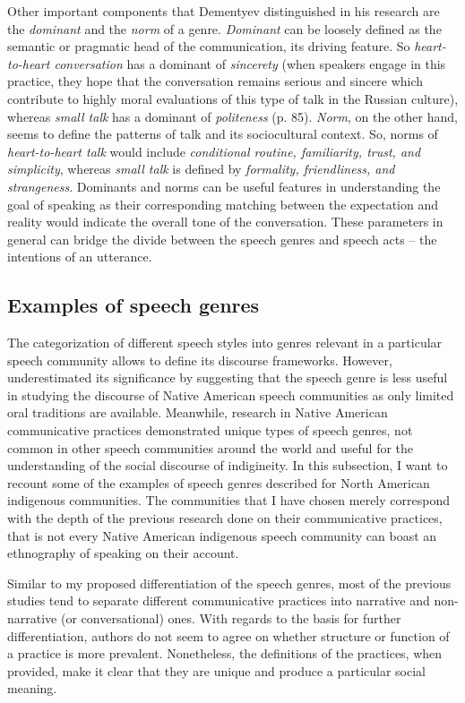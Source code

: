 \documentclass[12pt, draft]{article}
\begin{document}
Other important components that Dementyev distinguished in his research are the \textit{dominant} and the \textit{norm} of a genre. \textit{Dominant} can be loosely defined as the semantic or pragmatic head of the communication, its driving feature. So \textit{heart-to-heart conversation} has a dominant of \textit{sincerety} (when speakers engage in this practice, they hope that the conversation remains serious and sincere which contribute to highly moral evaluations of this type of talk in the Russian culture), whereas \textit{small talk} has a dominant of \textit{politeness} (p. 85). \textit{Norm}, on the other hand, seems to define the patterns of talk and its sociocultural context. So, norms of \textit{heart-to-heart talk} would include \textit{conditional routine, familiarity, trust, and simplicity}, whereas \textit{small talk} is defined by \textit{formality, friendliness, and strangeness}. Dominants and norms can be useful features in understanding the goal of speaking as their corresponding matching between the expectation and reality would indicate the overall tone of the conversation. These parameters in general can bridge the divide between the speech genres and speech acts -- the intentions of an utterance. 
\subsection{Examples of speech genres}
The categorization of different speech styles into genres relevant in a particular speech community allows to define its discourse frameworks. However, \textcite[p. 102]{dementyev2015} underestimated its significance by suggesting that the speech genre is less useful in studying the discourse of Native American speech communities as only limited oral traditions are available. Meanwhile, research in Native American communicative practices demonstrated unique types of speech genres, not common in other speech communities around the world and useful for the understanding of the social discourse of indigineity. In this subsection, I want to recount some of the examples of speech genres described for North American indigenous communities. The communities that I have chosen merely correspond with the depth of the previous research done on their communicative practices, that is not every Native American indigenous speech community can boast an ethnography of speaking on their account.

Similar to my proposed differentiation of the speech genres, most of the previous studies tend to separate different communicative practices into narrative and non-narrative (or conversational) ones. With regards to the basis for further differentiation, authors do not seem to agree on whether structure or function of a practice is more prevalent. Nonetheless, the definitions of the practices, when provided, make it clear that they are unique and produce a particular social meaning. 
\end{document}
